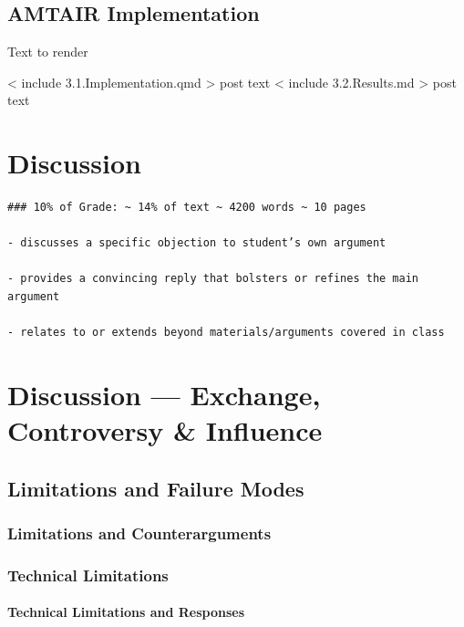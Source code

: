\documentclass[
  11pt,
  letterpaper,
]{book}
\begin{document}
\section{AMTAIR Implementation}\label{sec-amtair-implementation}

Text to render

{{< include 3.1.Implementation.qmd >}} post text
{{< include 3.2.Results.md >}} post text


\chapter{Discussion}\label{discussion}

\begin{verbatim}
### 10% of Grade: ~ 14% of text ~ 4200 words ~ 10 pages

- discusses a specific objection to student’s own argument

- provides a convincing reply that bolsters or refines the main argument

- relates to or extends beyond materials/arguments covered in class
\end{verbatim}


\chapter{Discussion --- Exchange, Controversy \&
Influence}\label{sec-discussion}

\section{Limitations and Failure Modes}\label{sec-limitationsA}

\subsection{Limitations and
Counterarguments}\label{sec-limitations-counterarguments}

\subsection{Technical Limitations}\label{sec-technical-limitations}

\subsubsection{Technical Limitations and
Responses}\label{sec-technical-limitations2}
\end{document}
